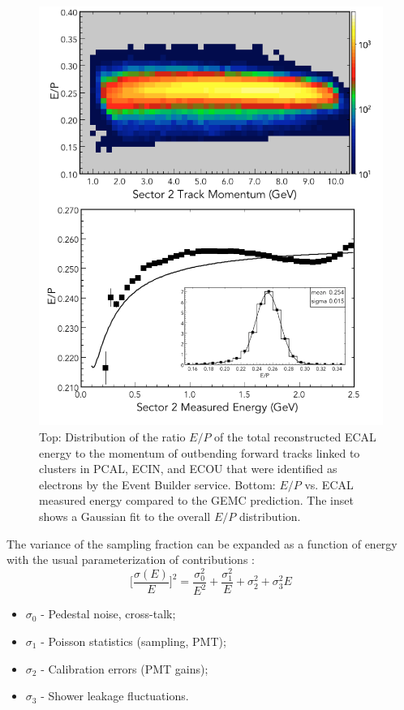 \begin{figure}[t]
\centering
\includegraphics[width=1.0\columnwidth,keepaspectratio]{img/S10_1_0.png}
\caption[]{Top: Distribution of the ratio $E/P$ of the total reconstructed ECAL energy to the momentum of
  outbending forward tracks linked to clusters in PCAL, ECIN, and ECOU that were identified as electrons by the
  Event Builder service. Bottom: $E/P$ vs. ECAL measured energy compared to the GEMC prediction. The inset
  shows a Gaussian fit to the overall $E/P$ distribution.}
\label{fig:S10_1_0}
\end{figure}

The variance of the sampling fraction can be expanded as a function of energy with the usual parameterization of
contributions \cite{ps1981}:
\begin{equation}
\biggl[\frac{\sigma(E)}{E}\biggr]^2 = \frac{\sigma^2_0}{E^2} + \frac{\sigma^2_1}{E} +\sigma^2_2 + \sigma^2_3 E 
\label{eq:sferror}
\end{equation}

\begin{itemize}
\item $\sigma_0$ - Pedestal noise, cross-talk;
\item $\sigma_1$ - Poisson statistics (sampling, PMT);
\item $\sigma_2$ - Calibration errors (PMT gains);
\item $\sigma_3$ - Shower leakage fluctuations.
\end{itemize}

